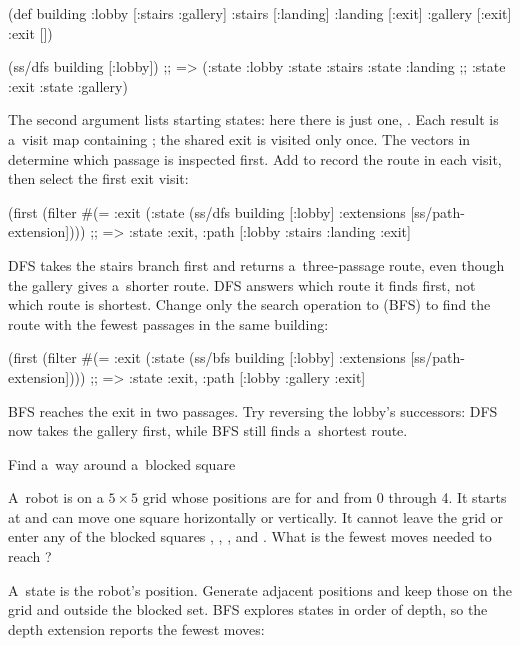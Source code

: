 \begtt {}
(def building
  {:lobby [:stairs :gallery]
   :stairs [:landing]
   :landing [:exit]
   :gallery [:exit]
   :exit []})

(ss/dfs building [:lobby])
;; => ({:state :lobby} {:state :stairs} {:state :landing}
;;     {:state :exit} {:state :gallery})
\endtt

The second argument lists starting states: here there is just one,
. Each result is a~visit map containing ; the
shared exit is visited only once. The vectors in  determine
which passage is inspected first. Add  to record the
route in each visit, then select the first exit visit:

\begtt {}
(first (filter #(= :exit (:state %
               (ss/dfs building [:lobby]
                           {:extensions [ss/path-extension]})))
;; => {:state :exit, :path [:lobby :stairs :landing :exit]}
\endtt

DFS takes the stairs branch first and returns a~three-passage route, even
though the gallery gives a~shorter route. DFS answers which route it finds
first, not which route is shortest. Change only the search operation to
(BFS) to find the route with the fewest passages in the same building:

\begtt {}
(first (filter #(= :exit (:state %
               (ss/bfs building [:lobby]
                           {:extensions [ss/path-extension]})))
;; => {:state :exit, :path [:lobby :gallery :exit]}
\endtt

BFS reaches the exit in two passages. Try reversing the lobby's successors:
DFS now takes the gallery first, while BFS still finds a~shortest route.

\secc Find a~way around a~blocked square

 A~robot is on a $5 \times 5$ grid whose positions
are \code{[x y]} for  and  from 0 through 4. It starts at
\code{[0 2]} and can move one square horizontally or vertically. It cannot
leave the grid or enter any of the blocked squares \code{[2 0]},
\code{[2 1]}, \code{[2 2]}, and \code{[2 3]}. What is the fewest moves
needed to reach \code{[4 2]}?

\smallskip
{} A~state is the robot's position. Generate adjacent
positions and keep those on the grid and outside the blocked set. BFS
explores states in order of depth, so the depth extension reports the
fewest moves:

